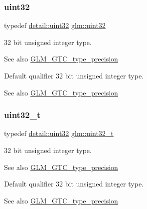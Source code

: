 \subsubsection{\texorpdfstring{uint32}{uint32}}
{\footnotesize\ttfamily typedef \mbox{\hyperlink{namespaceglm_1_1detail_ade6cfbf377022aaa391af8cd50489222}{detail\+::uint32}} \mbox{\hyperlink{group__gtc__type__precision_ga202b6a53c105fcb7e531f9b443518451}{glm\+::uint32}}}

32 bit unsigned integer type. \begin{DoxySeeAlso}{See also}
\mbox{\hyperlink{group__gtc__type__precision}{G\+L\+M\+\_\+\+G\+T\+C\+\_\+type\+\_\+precision}}
\end{DoxySeeAlso}
Default qualifier 32 bit unsigned integer type. \begin{DoxySeeAlso}{See also}
\mbox{\hyperlink{group__gtc__type__precision}{G\+L\+M\+\_\+\+G\+T\+C\+\_\+type\+\_\+precision}} 
\end{DoxySeeAlso}
\mbox{\label{group__gtc__type__precision_ga822ca53a9ad412504532838906276a99}} 
\subsubsection{\texorpdfstring{uint32\+\_\+t}{uint32\_t}}
{\footnotesize\ttfamily typedef \mbox{\hyperlink{namespaceglm_1_1detail_ade6cfbf377022aaa391af8cd50489222}{detail\+::uint32}} \mbox{\hyperlink{group__gtc__type__precision_ga822ca53a9ad412504532838906276a99}{glm\+::uint32\+\_\+t}}}

32 bit unsigned integer type. \begin{DoxySeeAlso}{See also}
\mbox{\hyperlink{group__gtc__type__precision}{G\+L\+M\+\_\+\+G\+T\+C\+\_\+type\+\_\+precision}}
\end{DoxySeeAlso}
Default qualifier 32 bit unsigned integer type. \begin{DoxySeeAlso}{See also}
\mbox{\hyperlink{group__gtc__type__precision}{G\+L\+M\+\_\+\+G\+T\+C\+\_\+type\+\_\+precision}} 
\end{DoxySeeAlso}
\mbox{\label{group__gtc__type__precision_gae3632bf9b37da66233d78930dd06378a}} 
